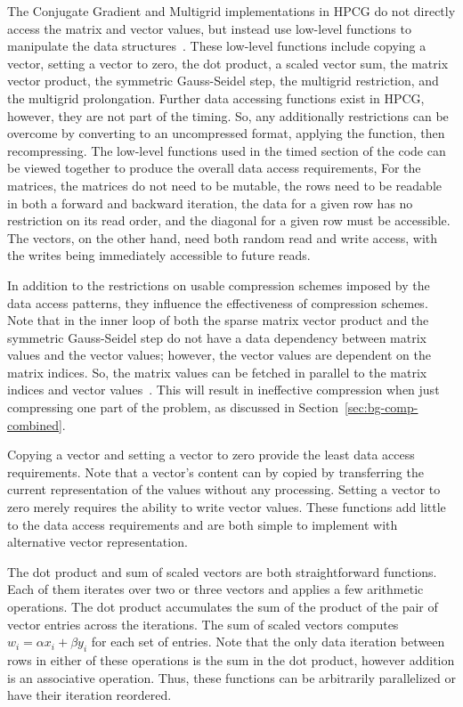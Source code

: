 The Conjugate Gradient and Multigrid implementations in HPCG do not directly access the matrix and vector values, but instead use low-level functions to manipulate the data structures~\cite{Dongarra:2015:HPCG}.
These low-level functions include copying a vector, setting a vector to zero, the dot product, a scaled vector sum, the matrix vector product, the symmetric Gauss-Seidel step, the multigrid restriction, and the multigrid prolongation.
Further data accessing functions exist in HPCG, however, they are not part of the timing.
So, any additionally restrictions can be overcome by converting to an uncompressed format, applying the function, then recompressing.
The low-level functions used in the timed section of the code can be viewed together to produce the overall data access requirements,
For the matrices, the matrices do not need to be mutable, the rows need to be readable in both a forward and backward iteration, the data for a given row has no restriction on its read order, and the diagonal for a given row must be accessible.
The vectors, on the other hand, need both random read and write access, with the writes being immediately accessible to future reads.

In addition to the restrictions on usable compression schemes imposed by the data access patterns, they influence the effectiveness of compression schemes.
Note that in the inner loop of both the sparse matrix vector product and the symmetric Gauss-Seidel step do not have a data dependency between matrix values and the vector values; however, the vector values are dependent on the matrix indices.
So, the matrix values can be fetched in parallel to the matrix indices and vector values~\cite{Hennessy:1990:ComputerArchitecture}.
This will result in ineffective compression when just compressing one part of the problem, as discussed in Section~\ref{sec:bg-comp-combined}.

Copying a vector and setting a vector to zero provide the least data access requirements.
Note that a vector's content can by copied by transferring the current representation of the values without any processing.
Setting a vector to zero merely requires the ability to write vector values.
These functions add little to the data access requirements and are both simple to implement with alternative vector representation.

The dot product and sum of scaled vectors are both straightforward functions.
Each of them iterates over two or three vectors and applies a few arithmetic operations.
The dot product accumulates the sum of the product of the pair of vector entries across the iterations.
The sum of scaled vectors computes \(w_i = \alpha x_i + \beta y_i\) for each set of entries.
Note that the only data iteration between rows in either of these operations is the sum in the dot product, however addition is an associative operation.
Thus, these functions can be arbitrarily parallelized or have their iteration reordered.

